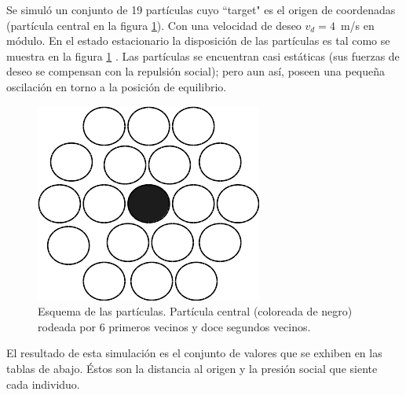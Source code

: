 Se simuló un conjunto de 19 partículas cuyo ``target" es el origen de coordenadas (partícula central en la figura \ref{central}). Con una velocidad de deseo $v_d=4$~m/s en módulo. En el estado estacionario la disposición de las partículas es tal como se muestra en la figura \ref{central} . Las partículas se encuentran casi estáticas (sus fuerzas de deseo se compensan con la repulsión social); pero aun así, poseen una pequeña oscilación en torno a la posición de equilibrio. 

\begin{figure}[H]
    \centering
        \includegraphics[scale=0.5]{figuras/central.png}
    \caption[width=5cm]{Esquema de las partículas. Partícula central (coloreada de negro) rodeada por 6 primeros vecinos y doce segundos vecinos.}
    \label{central}
\end{figure}


El resultado de esta simulación es el conjunto de valores que se exhiben en las tablas de abajo. Éstos son la distancia al origen y la presión social que siente cada individuo. 

